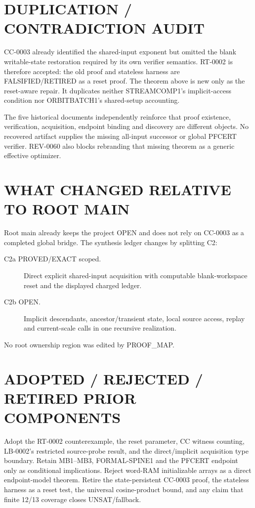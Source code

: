 \documentclass[11pt]{article}
\begin{document}
\section*{DUPLICATION / CONTRADICTION AUDIT}
CC-0003 already identified the shared-input exponent but omitted the blank
writable-state restoration required by its own verifier semantics.  RT-0002
is therefore accepted: the old proof and stateless harness are
FALSIFIED/RETIRED as a reset proof.  The theorem above is new only as the
reset-aware repair.  It duplicates neither STREAMCOMP1's implicit-access
condition nor ORBITBATCH1's shared-setup accounting.

The five historical documents independently reinforce that proof existence,
verification, acquisition, endpoint binding and discovery are different
objects.  No recovered artifact supplies the missing all-input successor or
global PFCERT verifier.  REV-0060 also blocks rebranding that missing theorem as
a generic effective optimizer.

\section*{WHAT CHANGED RELATIVE TO ROOT MAIN}
Root main already keeps the project OPEN and does not rely on CC-0003 as a
completed global bridge.  The synthesis ledger changes by splitting C2:
\begin{description}
\item[C2a PROVED/EXACT scoped.] Direct explicit shared-input acquisition with
computable blank-workspace reset and the displayed charged ledger.
\item[C2b OPEN.] Implicit descendants, ancestor/transient state, local source
access, replay and current-scale calls in one recursive realization.
\end{description}
No root ownership region was edited by PROOF\_MAP.

\section*{ADOPTED / REJECTED / RETIRED PRIOR COMPONENTS}
Adopt the RT-0002 counterexample, the reset parameter, CC witness counting,
LB-0002's restricted source-probe result, and the direct/implicit acquisition
type boundary.  Retain MB1--MB3, FORMAL-SPINE1 and the PFCERT endpoint only as
conditional implications.  Reject word-RAM initializable arrays as a direct
endpoint-model theorem.  Retire the state-persistent CC-0003 proof, the
stateless harness as a reset test, the universal cosine-product bound, and any
claim that finite 12/13 coverage closes UNSAT/fallback.
\end{document}
